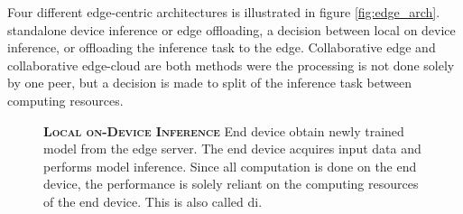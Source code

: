 Four different edge-centric architectures is illustrated in figure \ref{fig:edge_arch}. \protect{} standalone device inference or \protect{} edge offloading, a decision between local on device inference, or offloading the inference task to the edge. Collaborative edge\protect{} and collaborative edge-cloud \protect{} are both methods were the processing is not done solely by one peer, but a decision is made to split of the inference task between computing resources.
\begin{figure}
	\begin{minipage}{0.65\linewidth}
		\textbf{\protect{} \textsc{Local on-Device Inference}}
		\color{caption-color} \newline
		End device obtain newly trained model from the edge server. The end device acquires input data and performs model inference. Since all computation is done on the end device, the performance is solely reliant on the computing resources of the end device. This is also called \acrlong{di}.
	\end{minipage}%
	\hfill
	\begin{minipage}{0.3\linewidth}
		\centering
		\captionsetup[subfigure]{justification=centering}
		\begin{figure}
			\centering
		\end{figure}
	\end{minipage}
	

\end{figure}
